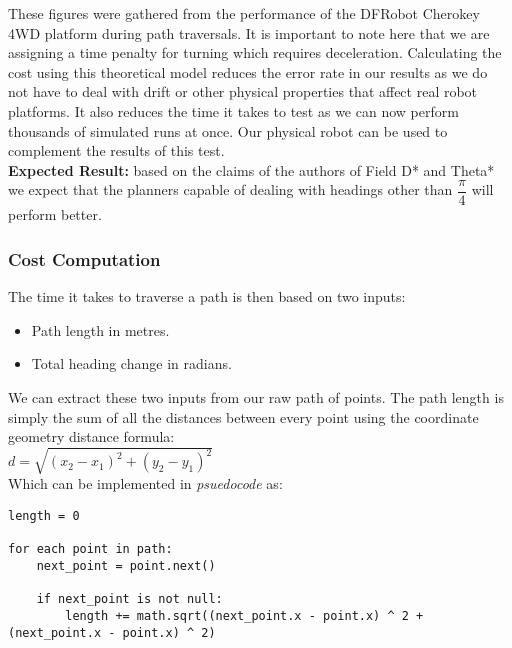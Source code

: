 \noindent
These figures were gathered from the performance of the DFRobot Cherokey 4WD platform during path traversals. It is important to note here that we are assigning a time penalty for turning which requires deceleration. Calculating the cost using this theoretical model reduces the error rate in our results as we do not have to deal with drift or other physical properties that affect real robot platforms. It also reduces the time it takes to test as we can now perform thousands of simulated runs at once. Our physical robot can be used to complement the results of this test. \\

\noindent
\textbf{Expected Result:} based on the claims of the authors of Field D* and Theta* we expect that the planners capable of dealing with headings other than $\dfrac{\pi}{4}$ will perform better.

\newpage

\subsubsection{Cost Computation}

\noindent
The time it takes to traverse a path is then based on two inputs:

\begin{itemize}
\item Path length in metres.
\item Total heading change in radians.
\end{itemize}

\noindent
We can extract these two inputs from our raw path of points. The path length is simply the sum of all the distances between every point using the coordinate geometry distance formula: \\

\indent $d = \sqrt{(x_{2} - x_{1})^{2} + (y_{2} - y_{1})^{2}}$ \\

\noindent
Which can be implemented in \textit{psuedocode} as: \\

\begin{lstlisting}
length = 0

for each point in path:
	next_point = point.next()
	
	if next_point is not null:
		length += math.sqrt((next_point.x - point.x) ^ 2 + (next_point.x - point.x) ^ 2)
\end{lstlisting}

